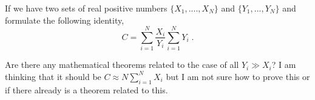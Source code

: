 \documentclass{letter}
\begin{document}
If we have two  sets of real positive  numbers $\{X_1, ...., X_N\}$ and $\{Y_1, ... , Y_N\}$ and formulate the following identity, 
\begin{equation}
C = \sum_{i=1}^{N} \frac{X_i}{Y_i}\sum_{i=1}^{N}Y_i \;.
\end{equation}

Are there any mathematical theorems related to the case of all $Y_i \gg X_i$?  I am thinking that it should be $C \approx N\sum_{i=1}^{N}X_i$ but I am not sure how to prove this or if there already is a theorem  related to this.
\end{document}
